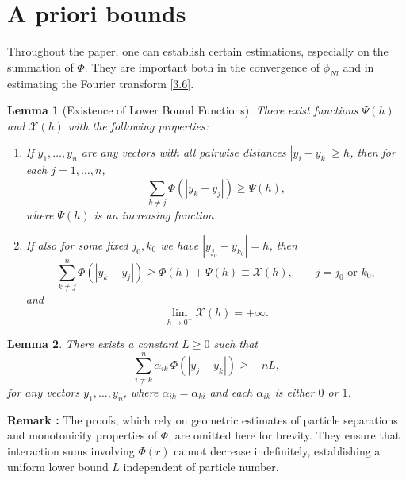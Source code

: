 \documentclass[11pt]{article}
\newtheorem{lemma}{Lemma}
\begin{document}



\appendix
\section{A priori bounds}\label{sectionAbounds}
 Throughout the paper, one can establish certain estimations, especially on the summation of $\Phi$. They are important both in the convergence of $\phi_{Nl}$ and in estimating the Fourier transform \eqref{3.6}. 
\begin{lemma}
    [Existence of Lower Bound Functions]\label{lem:psi_chi}
There exist functions $\Psi(h)$ and $\mathcal{X}(h)$ with the following properties:
\begin{enumerate}[label=(\alph*)]
    \item If $y_1, \dots, y_n$ are any vectors with all pairwise distances 
    $|y_i - y_k| \ge h$, then for each $j=1,\dots,n$,
    \begin{equation*}
    \sum_{k\ne j} \Phi\!\left(|y_k - y_j|\right) \ge \Psi(h),
    \end{equation*}
    where $\Psi(h)$ is an increasing function.
    
    \item If also for some fixed $j_0,k_0$ we have $|y_{j_0} - y_{k_0}| = h$, then
    \begin{equation*}
    \sum_{k\ne j}^n \Phi\!\left(|y_k-y_j|\right) 
    \ge \Phi(h) + \Psi(h) \equiv \mathcal{X}(h),
    \qquad j = j_0 \text{ or } k_0,
    \end{equation*}
    and 
    \[
    \lim_{h \to 0^+} \mathcal{X}(h) = +\infty.
    \]
\end{enumerate}
    
\end{lemma}

\begin{lemma}
    \label{thm:lower_bound}
There exists a constant $L \ge 0$ such that
\begin{equation}
\sum_{i\neq k}^n \alpha_{ik}\, \Phi\!\left(|y_j - y_k|\right)
\ge -\, n L,\tag{A.1}
\label{eq:lower_bound}
\end{equation}
for any vectors $y_1, \dots, y_n$, where $\alpha_{ik} = \alpha_{ki}$ and each $\alpha_{ik}$ is either $0$ or $1$.
\end{lemma}

\textbf{Remark :} The proofs, which rely on geometric estimates of particle separations and monotonicity properties of $\Phi$, are omitted here for brevity. They ensure that interaction sums involving $\Phi(r)$ cannot decrease indefinitely, establishing a uniform lower bound $L$ independent of particle number.
\end{document}
